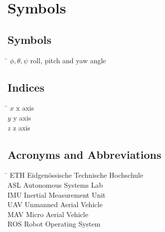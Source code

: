 \chapter*{Symbols}
\label{sec:symbols}


\section*{Symbols}

\begin{tabbing}
 \hspace*{1.6cm} \= \kill
  $\phi, \theta, \psi$    \> roll, pitch and yaw angle 		
\end{tabbing}

\section*{Indices}
\begin{tabbing}
 \hspace*{1.6cm}  \= \kill
 $x$ \> x axis \\[0.5ex]
 $y$ \> y axis \\[0.5ex]
 $z$ \> z axis \\[0.5ex]
\end{tabbing}

\section*{Acronyms and Abbreviations}
\begin{tabbing}
 \hspace*{1.6cm}  \= \kill
 ETH \> Eidgenössische Technische Hochschule \\[0.5ex]
 ASL \> Autonomous Systems Lab \\[0.5ex]
 IMU \> Inertial Measurement Unit \\[0.5ex]
 UAV \> Unmanned Aerial Vehicle \\[0.5ex]
 MAV \> Micro Aerial Vehicle \\[0.5ex]
 ROS \> Robot Operating System
\end{tabbing}